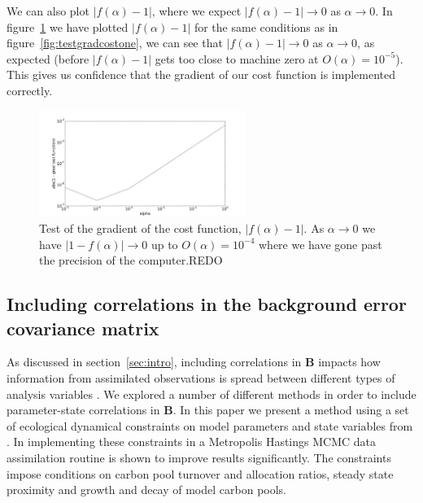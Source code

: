 \documentclass[11pt]{article}
\begin{document}
We can also plot $|f(\alpha)-1|$, where we expect $|f(\alpha)-1| \rightarrow 0$ as $\alpha \rightarrow 0$.  In figure~\ref{fig:testgradcost} we have plotted $|f(\alpha)-1|$ for the same conditions as in figure~\ref{fig:testgradcostone}, we can see that $|f(\alpha) - 1| \rightarrow 0$ as $\alpha \rightarrow 0$, as expected (before $|f(\alpha)-1|$ gets too close to machine zero at $O(\alpha) = 10^{-5}$). This gives us confidence that the gradient of our cost function is implemented correctly.
\begin{figure}[ht]
    \centering
    \includegraphics[width=0.6\textwidth]{testgradcost1.png}
    \caption{Test of the gradient of the cost function, $|f(\alpha) -1|$. As $\alpha \rightarrow 0$ we have $| 1 - f(\alpha) | \rightarrow 0$ up to $O(\alpha) = 10^{-4}$ where we have gone past the precision of the computer.{\color{red}REDO}}
    \label{fig:testgradcost}
\end{figure}

\subsection{Including correlations in the background error covariance matrix} \label{sec:corB}

As discussed in section~\ref{sec:intro}, including correlations in \textbf{B} impacts how information from assimilated observations is spread between different types of analysis variables \citep{bannister2008review}. We explored a number of different methods in order to include parameter-state correlations in \textbf{B}. In this paper we present a method using a set of ecological dynamical constraints on model parameters and state variables from \citet{Bloom2015}. In \citet{Bloom2015} implementing these constraints in a Metropolis Hastings MCMC data assimilation routine is shown to improve results significantly. The constraints impose conditions on carbon pool turnover and allocation ratios, steady state proximity and growth and decay of model carbon pools.
\end{document}
